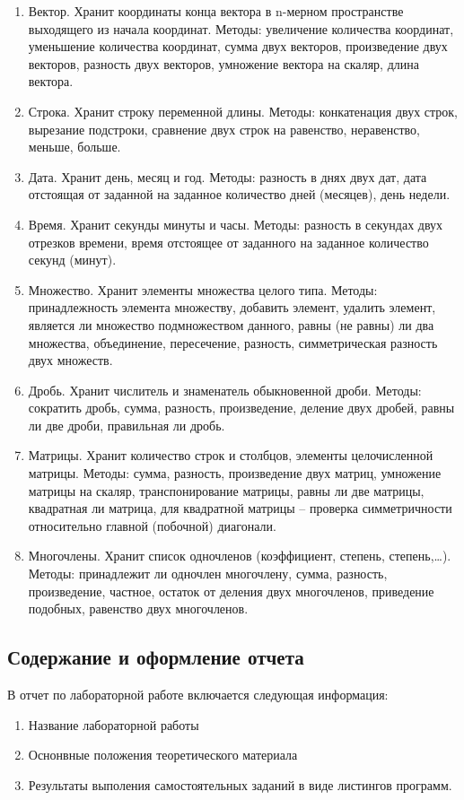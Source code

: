 \documentclass[a4paper,report,14pt]{ncc}
\begin{document}
\begin{enumerate}
 \item  Вектор.
Хранит координаты конца вектора в n-мерном пространстве выходящего из
начала координат. Методы: увеличение количества координат, уменьшение
количества координат, сумма двух векторов, произведение двух векторов,
разность двух векторов, умножение вектора на скаляр, длина вектора.
\item  Строка.
Хранит строку переменной длины. Методы: конкатенация двух строк,
вырезание подстроки, сравнение двух строк на равенство, неравенство, меньше,
больше.
\item  Дата.
Хранит день, месяц и год. Методы: разность в днях двух дат, дата отстоящая от
заданной на заданное количество дней (месяцев), день недели.
\item  Время.
Хранит секунды минуты и часы. Методы: разность в секундах двух отрезков
времени, время отстоящее от заданного на заданное количество секунд (минут).
\item  Множество.
Хранит элементы множества целого типа. Методы: принадлежность элемента
множеству, добавить элемент, удалить элемент, является ли множество
подмножеством данного, равны (не равны) ли два множества, объединение,
пересечение, разность, симметрическая разность двух множеств.
\item  Дробь.
Хранит числитель и знаменатель обыкновенной дроби. Методы: сократить
дробь, сумма, разность, произведение, деление двух дробей, равны ли две
дроби, правильная ли дробь.
\item  Матрицы.
Хранит количество строк и столбцов, элементы целочисленной матрицы.
Методы: сумма, разность, произведение двух матриц, умножение матрицы на
скаляр, транспонирование матрицы, равны ли две матрицы, квадратная ли
матрица, для квадратной матрицы – проверка симметричности относительно
главной (побочной) диагонали.
\item Многочлены.
Хранит список одночленов (коэффициент, степень, степень,…). Методы:
принадлежит ли одночлен многочлену, сумма, разность, произведение, частное,
остаток от деления двух многочленов, приведение подобных, равенство двух
многочленов. 
\end{enumerate}


\subsection{Содержание и оформление отчета}

В отчет по лабораторной работе включается следующая информация:

\begin{enumerate}
 \item Название лабораторной работы
 \item Оснонвные положения теоретического материала
 \item Результаты выполения самостоятельных заданий в виде листингов программ.
\end{enumerate}
\end{document}

